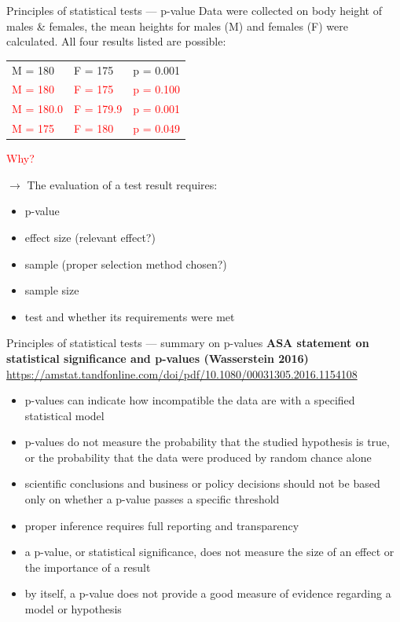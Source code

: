 \documentclass[
  ignorenonframetext,
  aspectratio=169,
  t]{beamer}
\providecommand{\tightlist}{%
  \setlength{\itemsep}{0pt}\setlength{\parskip}{0pt}}
\begin{document}
\begin{frame}{Principles of statistical tests --- p-value}
\protect{}\label{principles-of-statistical-tests-p-value-2}
Data were collected on body height of males \& females, the mean heights
for males (M) and females (F) were calculated. All four results listed
are possible:

\begin{center}
\begin{tabular}{lll}
M = 180 & F = 175 & p = 0.001 \\
\textcolor{red}{M = 180} & \textcolor{red}{F = 175} & \textcolor{red}{p = 0.100} \\
\textcolor{red}{M = 180.0} & \textcolor{red}{F = 179.9} & \textcolor{red}{p = 0.001} \\
\textcolor{red}{M = 175} & \textcolor{red}{F = 180} & \textcolor{red}{p = 0.049} \\
\end{tabular}
\end{center}

\textcolor{red}{Why?}

\(\rightarrow\) The evaluation of a test result requires:

\begin{itemize}
\tightlist
\item
  p-value
\item
  effect size (relevant effect?)
\item
  sample (proper selection method chosen?)
\item
  sample size
\item
  test and whether its requirements were met
\end{itemize}
\end{frame}

\begin{frame}{Principles of statistical tests --- summary on p-values}
\protect{}\label{principles-of-statistical-tests-summary-on-p-values}
\textbf{ASA statement on statistical significance and p-values (Wasserstein 2016)}
\footnotesize \url{https://amstat.tandfonline.com/doi/pdf/10.1080/00031305.2016.1154108}\normalsize

\begin{itemize}
\tightlist
\item
  p-values can indicate how incompatible the data are with a specified
  statistical model
\item
  p-values do not measure the probability that the studied hypothesis is
  true, or the probability that the data were produced by random chance
  alone
\item
  scientific conclusions and business or policy decisions should not be
  based only on whether a p-value passes a specific threshold
\item
  proper inference requires full reporting and transparency
\item
  a p-value, or statistical significance, does not measure the size of
  an effect or the importance of a result
\item
  by itself, a p-value does not provide a good measure of evidence
  regarding a model or hypothesis
\end{itemize}
\end{frame}
\end{document}
